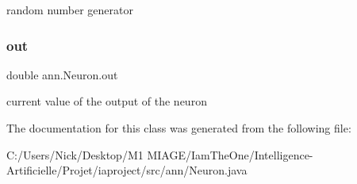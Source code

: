 random number generator \mbox{\label{classann_1_1_neuron_a50568ffff3bd8194ded913041414b244}} 
\subsubsection{\texorpdfstring{out}{out}}
{\footnotesize\ttfamily double ann.\+Neuron.\+out\hspace{0.3cm}{\ttfamily [protected]}}

current value of the output of the neuron 

The documentation for this class was generated from the following file\+:\begin{DoxyCompactItemize}
\item 
C\+:/\+Users/\+Nick/\+Desktop/\+M1 M\+I\+A\+G\+E/\+Iam\+The\+One/\+Intelligence-\/\+Artificielle/\+Projet/iaproject/src/ann/Neuron.\+java\end{DoxyCompactItemize}
